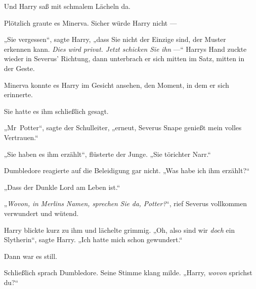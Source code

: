 Und Harry saß mit schmalem Lächeln da.

Plötzlich graute es Minerva. Sicher würde Harry nicht —

„Sie vergessen“, sagte Harry, „dass Sie nicht der Einzige sind, der Muster erkennen kann. \emph{Dies wird privat. Jetzt schicken Sie ihn} —“ Harrys Hand zuckte wieder in Severus’ Richtung, dann unterbrach er sich mitten im Satz, mitten in der Geste.

Minerva konnte es Harry im Gesicht ansehen, den Moment, in dem er sich erinnerte.

Sie hatte es ihm schließlich gesagt.

„Mr~Potter“, sagte der Schulleiter, „erneut, Severus Snape genießt mein volles Vertrauen.“

„Sie haben es ihm erzählt“, flüsterte der Junge.
„Sie törichter Narr.“

Dumbledore reagierte auf die Beleidigung gar nicht.
„Was habe ich ihm erzählt?“

„Dass der Dunkle Lord am Leben ist.“

„\emph{Wovon, in Merlins Namen, sprechen Sie da, Potter?}“, rief Severus vollkommen verwundert und wütend.

Harry blickte kurz zu ihm und lächelte grimmig.
„Oh, also sind wir \emph{doch} ein Slytherin“, sagte Harry.
„Ich hatte mich schon gewundert.“

Dann war es still.

Schließlich sprach Dumbledore. Seine Stimme klang milde.
„Harry, \emph{wovon} sprichst du?“


